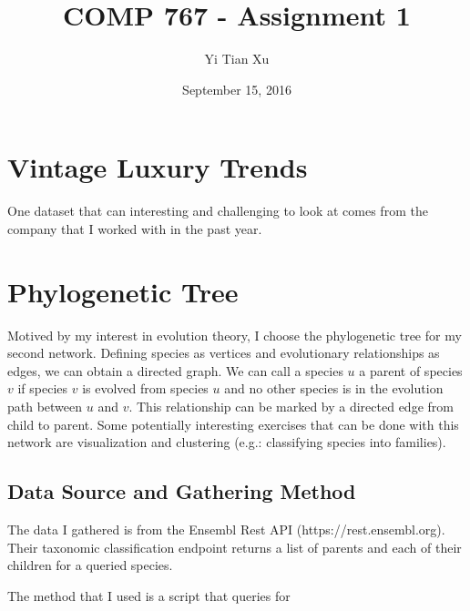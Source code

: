 \documentclass[12pt]{article}
\begin{document}
\title{COMP 767 - Assignment 1}
\author{Yi Tian Xu}
\date{September 15, 2016}
\maketitle

\section{Vintage Luxury Trends}

One dataset that can interesting and challenging to look at comes from the company that I worked with in the past year.


\section{Phylogenetic Tree}

Motived by my interest in evolution theory, I choose the phylogenetic tree for my second network. Defining species as vertices and evolutionary relationships as edges, we can obtain a directed graph. We can call a species $u$ a parent of species $v$ if species $v$ is evolved from species $u$ and no other species is in the evolution path between $u$ and $v$. This relationship can be marked by a directed edge from child to parent. Some potentially interesting exercises that can be done with this network are visualization and clustering (e.g.: classifying species into families). 

\subsection{Data Source and Gathering Method}

The data I gathered is from the Ensembl Rest API (https://rest.ensembl.org). Their taxonomic classification endpoint returns a list of parents and each of their children for a queried species. 

The method that I used is a script that queries for 
\end{document}
